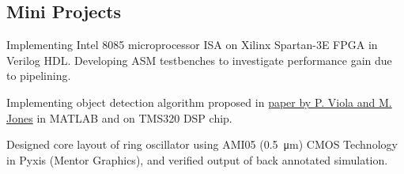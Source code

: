 \documentclass[]{deedy}
\begin{document}
\begin{minipage}[t]{0.72\textwidth}
\begin{flushleft}
\section{Mini Projects}
%
\begin{tightemize}
\item Implementing Intel 8085 microprocessor ISA on Xilinx Spartan-3E FPGA in Verilog HDL. Developing ASM testbenches to investigate performance gain due to pipelining.
\end{tightemize}
\sectionsep
%
\begin{tightemize}
\item Implementing object detection algorithm proposed in \href{https://www.cs.cmu.edu/~efros/courses/LBMV07/Papers/viola-cvpr-01.pdf}{paper by P. Viola and M. Jones} in MATLAB and on TMS320 DSP chip.
\end{tightemize}
\sectionsep
%
\begin{tightemize}
\item Designed core layout of ring oscillator using AMI05 (\SI{0.5}{\micro\metre}) CMOS Technology in Pyxis (Mentor Graphics), and verified output of back annotated simulation.
\end{tightemize}
\sectionsep
\end{flushleft}
\end{minipage}
%
\pagebreak
%
\end{document}
